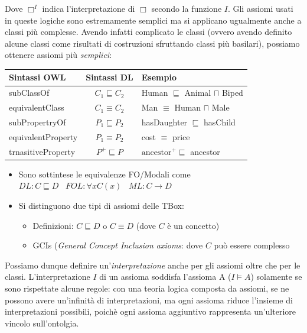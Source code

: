 \documentclass[11pt]{article}
\begin{document}
Dove $\Box^I$ indica l'interpretazione di $\Box$ secondo la funzione $I$. \newline
Gli assiomi usati in queste logiche sono estremamente semplici ma si applicano ugualmente anche a classi più complesse. Avendo infatti complicato le classi (ovvero avendo definito alcune classi come risultati di costruzioni sfruttando classi più basilari), possiamo ottenere assiomi più \textit{semplici}:
\begin{center}
  \begin{tabular}{l|c|l}
    Sintassi OWL & Sintassi DL & Esempio \\ \hline
    subClassOf & $C_1 \sqsubseteq C_2$ & Human $\sqsubseteq$ Animal $\sqcap$ Biped \\
    equivalentClass & $C_1 \equiv C_2$ & Man $\equiv$ Human $\sqcap$ Male \\
    subPropertryOf & $P_1 \sqsubseteq P_2$ & hasDaughter $\sqsubseteq$ hasChild \\
    equivalentProperty & $P_1 \equiv P_2$ & cost $\equiv$ price \\
    trnasitiveProperty & $P^+ \sqsubseteq P$ & $\text{ancestor}^+ \sqsubseteq$ ancestor
  \end{tabular}
  \begin{itemize}
  \item Sono sottintese le equivalenze FO/Modali come $DL: C \sqsubseteq D \hspace{10pt} FOL: \forall x C(x) \hspace{10pt} ML: C \rightarrow D$
  \item Si distinguono due tipi di assiomi delle TBox:
    \begin{itemize}
    \item Definizioni: $C \sqsubseteq D$ o $C \equiv D$ (dove $C$ è un concetto)
      \item GCIs (\textit{General Concept Inclusion axioms}: dove $C$ può essere complesso
    \end{itemize}
  \end{itemize}
\end{center}

Possiamo dunque definire un'\textit{interpretazione} anche per gli assiomi oltre che per le classi.
L'interpretazione $I$ di un assioma soddisfa l'assioma A ($I \models A$) solamente se sono rispettate alcune regole: con una teoria logica composta da assiomi, se ne possono avere un'infinità di interpretazioni, ma ogni assioma riduce l'insieme di interpretazioni possibili, poichè ogni assioma aggiuntivo rappresenta un'ulteriore vincolo sull'ontolgia.
\end{document}
